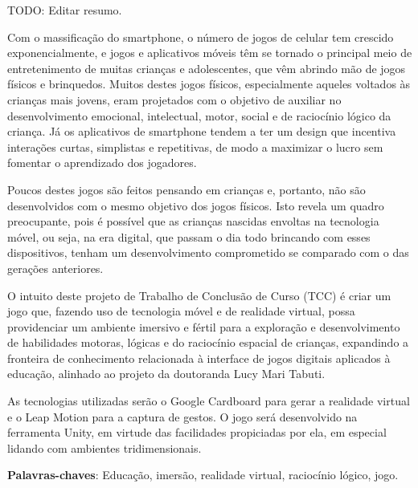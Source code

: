 \begin{resumo}
\begin{comment}
O resumo deve ser redigido, preferencialmente, na terceira pessoa do singular com verbo na voz ativa, em parágrafo único, e conter no máximo 500 palavras.
\end{comment}

TODO: Editar resumo.

Com o massificação do smartphone, o número de jogos de celular tem crescido exponencialmente, e jogos e aplicativos móveis têm se tornado o principal meio de entretenimento de muitas crianças e adolescentes, que vêm abrindo mão de jogos físicos e brinquedos. Muitos destes jogos físicos, especialmente aqueles voltados às crianças mais jovens, eram projetados com o objetivo de auxiliar no desenvolvimento emocional, intelectual, motor, social e de raciocínio lógico da criança. Já os aplicativos de smartphone tendem a ter um design que incentiva interações curtas, simplistas e repetitivas, de modo a maximizar o lucro sem fomentar o aprendizado dos jogadores.

Poucos destes jogos são feitos pensando em crianças e, portanto, não são desenvolvidos com o mesmo objetivo dos jogos físicos. Isto revela um quadro preocupante, pois é possível que as crianças nascidas envoltas na tecnologia móvel, ou seja, na era digital, que passam o dia todo brincando com esses dispositivos, tenham um desenvolvimento comprometido se comparado com o das gerações anteriores.

O intuito deste projeto de Trabalho de Conclusão de Curso (TCC) é criar um jogo que, fazendo uso de tecnologia móvel e de realidade virtual, possa providenciar um ambiente imersivo e fértil para a exploração e desenvolvimento de habilidades motoras, lógicas e do raciocínio espacial de crianças, expandindo a fronteira de conhecimento relacionada à interface de jogos digitais aplicados à educação, alinhado ao projeto da doutoranda Lucy Mari Tabuti.

As tecnologias utilizadas serão o Google Cardboard para gerar a realidade virtual e o Leap Motion para a captura de gestos. O jogo será desenvolvido na ferramenta Unity, em virtude das facilidades propiciadas por ela, em especial lidando com ambientes tridimensionais.

 \vspace{\onelineskip}

 \noindent
 \textbf{Palavras-chaves}: Educação, imersão, realidade virtual, raciocínio lógico, jogo.
\end{resumo}
 

